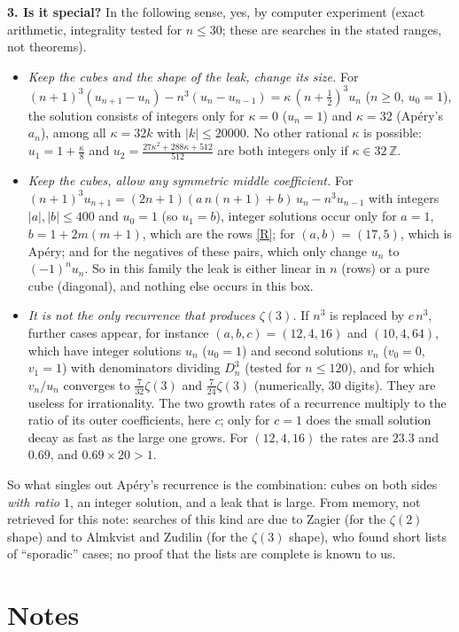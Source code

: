 \documentclass[11pt]{article}
\newcommand{\Z}{\mathbb Z}
\newcommand{\q}[1]{\medskip\noindent\textbf{#1}}
\begin{document}
\q{3. Is it special?} In the following sense, yes, by computer experiment (exact arithmetic,
integrality tested for $n\le30$; these are searches in the stated ranges, not theorems).
\begin{itemize}
\item \emph{Keep the cubes and the shape of the leak, change its size.} For
$(n+1)^3(u_{n+1}-u_n)-n^3(u_n-u_{n-1})=\kappa\,(n+\frac12)^3u_n$ ($n\ge0$, $u_0=1$), the solution
consists of integers only for $\kappa=0$ ($u_n=1$) and $\kappa=32$ (Ap\'ery's $a_n$), among all
$\kappa=32k$ with $|k|\le20000$. No other rational $\kappa$ is possible: $u_1=1+\frac\kappa8$ and
$u_2=\frac{27\kappa^2+288\kappa+512}{512}$ are both integers only if $\kappa\in32\,\Z$.
\item \emph{Keep the cubes, allow any symmetric middle coefficient.} For
$(n+1)^3u_{n+1}=(2n+1)(a\,n(n+1)+b)\,u_n-n^3u_{n-1}$ with integers $|a|,|b|\le400$ and $u_0=1$ (so $u_1=b$), integer
solutions occur only for $a=1$, $b=1+2m(m+1)$, which are the rows \eqref{R}; for $(a,b)=(17,5)$, which is
Ap\'ery; and for the negatives of these pairs, which only change $u_n$ to $(-1)^nu_n$. So in this
family the leak is either linear in $n$ (rows) or a pure cube (diagonal), and nothing else occurs in this box.
\item \emph{It is not the only recurrence that produces $\zeta(3)$.} If $n^3$ is replaced by
$c\,n^3$, further cases appear, for instance $(a,b,c)=(12,4,16)$ and $(10,4,64)$, which
have integer solutions $u_n$ ($u_0=1$) and second solutions $v_n$ ($v_0=0$, $v_1=1$) with
denominators dividing $D_n^3$ (tested for $n\le120$), and for which $v_n/u_n$ converges to
$\frac7{32}\zeta(3)$ and $\frac7{24}\zeta(3)$ (numerically, 30 digits). They are useless for
irrationality. The two growth rates of a recurrence multiply to the ratio of its outer
coefficients, here $c$; only for $c=1$ does the small solution decay as fast as the large one
grows. For $(12,4,16)$ the rates are $23.3$ and $0.69$, and $0.69\times20>1$.
\end{itemize}
So what singles out Ap\'ery's recurrence is the combination: cubes on both sides \emph{with ratio
$1$}, an integer solution, and a leak that is large. From memory, not retrieved for this note:
searches of this kind are due to Zagier (for the $\zeta(2)$ shape) and to Almkvist and Zudilin
(for the $\zeta(3)$ shape), who found short lists of ``sporadic'' cases; no proof that the lists
are complete is known to us.

\section{Notes}
\end{document}
